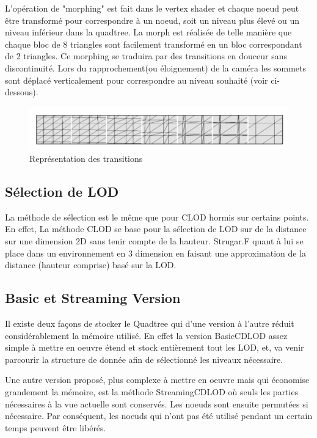   L'opération de "morphing" est fait dans le vertex shader et chaque noeud peut être transformé pour correspondre à un noeud, soit un niveau plus élevé ou un niveau inférieur dans la quadtree. La morph est réalisée de telle manière que chaque bloc de 8 triangles sont  facilement transformé en un bloc correspondant de 2 triangles. Ce morphing se traduira par des transitions en douceur sans discontinuité.
  Lors du rapprochement(ou éloignement) de la caméra les sommets sont déplacé verticalement pour correspondre au niveau souhaité (voir ci-dessous).
\begin{figure}[!ht]
    \includegraphics[width=12cm]{img/morph-transition.png}
    \caption[morph-transition]{Représentation des transitions \protect\footnotemark}
    \label{fig:morph-transition}
    \end{figure}
    
\subsection{Sélection de LOD}
    
    La méthode de sélection est le même que pour CLOD hormis sur certains points. En effet, La méthode CLOD se base pour la sélection de LOD sur de la distance sur une dimension 2D sans tenir compte de la hauteur. Strugar.F quant à lui se place dans un environnement en 3 dimension en faisant une approximation de la distance (hauteur comprise) basé sur la LOD.


\subsection{Basic et Streaming Version}

    Il existe deux façons de stocker le Quadtree qui d'une version à l'autre réduit considérablement la mémoire utilisé. En effet la version BasicCDLOD assez simple à mettre en oeuvre étend et stock entièrement tout les LOD, et, va venir parcourir la structure de donnée afin de sélectionné les niveaux nécessaire.
   
    Une autre version proposé, plus complexe à mettre en oeuvre mais qui économise grandement la mémoire, est la méthode StreamingCDLOD où seuls les parties nécessaires à la vue actuelle sont conservés. Les noeuds sont ensuite permutées si nécessaire. Par conséquent, les noeuds qui n'ont pas été utilisé pendant un certain temps peuvent être libérés.